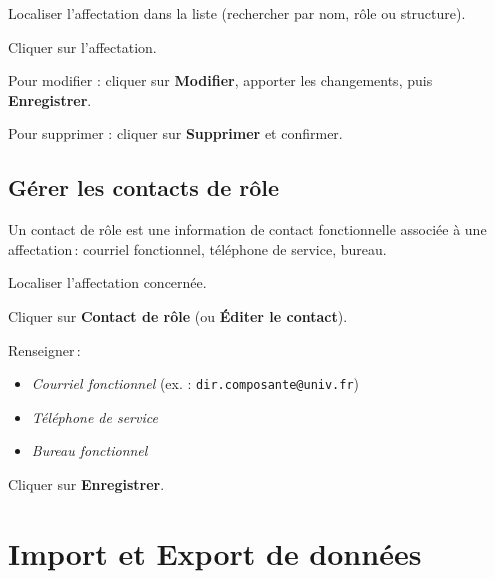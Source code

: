 \begin{steps}
  \item Localiser l'affectation dans la liste (rechercher par nom, r\^ole ou structure).
  \item Cliquer sur l'affectation.
  \item Pour modifier : cliquer sur \textbf{Modifier}, apporter les changements, puis \textbf{Enregistrer}.
  \item Pour supprimer : cliquer sur \textbf{Supprimer} et confirmer.
\end{steps}

\subsection{G\'erer les contacts de r\^ole}

Un contact de r\^ole est une information de contact fonctionnelle associ\'ee \`a une affectation\,: courriel fonctionnel, t\'el\'ephone de service, bureau.

\begin{steps}
  \item Localiser l'affectation concern\'ee.
  \item Cliquer sur \textbf{Contact de r\^ole} (ou \textbf{\'Editer le contact}).
  \item Renseigner\,:
    \begin{itemize}
      \item \textit{Courriel fonctionnel} (ex. : \texttt{dir.composante@univ.fr})
      \item \textit{T\'el\'ephone de service}
      \item \textit{Bureau fonctionnel}
    \end{itemize}
  \item Cliquer sur \textbf{Enregistrer}.
\end{steps}


\section{Import et Export de donn\'ees}

